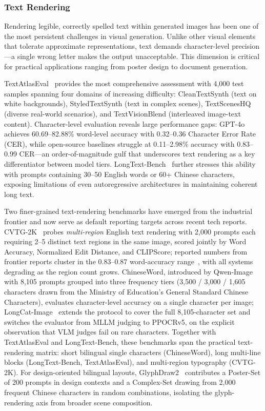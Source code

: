 \documentclass{llmxive}
\begin{document}
\subsubsection{Text Rendering}

Rendering legible, correctly spelled text within generated images has been one of the most persistent challenges in visual generation. Unlike other visual elements that tolerate approximate representations, text demands character-level precision---a single wrong letter makes the output unacceptable. This dimension is critical for practical applications ranging from poster design to document generation.

TextAtlasEval~\citep{TextAtlas5M} provides the most comprehensive assessment with 4,000 test samples spanning four domains of increasing difficulty: CleanTextSynth (text on white backgrounds), StyledTextSynth (text in complex scenes), TextScenesHQ (diverse real-world scenarios), and TextVisionBlend (interleaved image-text content). Character-level evaluation reveals large performance gaps: GPT-4o achieves 60.69--82.88\% word-level accuracy with 0.32--0.36 Character Error Rate (CER), while open-source baselines struggle at 0.11--2.98\% accuracy with 0.83--0.99 CER---an order-of-magnitude gulf that underscores text rendering as a key differentiator between model tiers. LongText-Bench~\citep{X-Omni} further stresses this ability with prompts containing 30--50 English words or 60+ Chinese characters, exposing limitations of even autoregressive architectures in maintaining coherent long text.

Two finer-grained text-rendering benchmarks have emerged from the industrial frontier and now serve as default reporting targets across recent tech reports. CVTG-2K~\citep{tai2025investigating} probes \emph{multi-region} English text rendering with 2{,}000 prompts each requiring 2--5 distinct text regions in the same image, scored jointly by Word Accuracy, Normalized Edit Distance, and CLIPScore; reported numbers from frontier reports cluster in the 0.83--0.87 word-accuracy range~\citep{wu2025qwen, cai2025z, team2025longcat, jdjoyaiimage}, with all systems degrading as the region count grows. ChineseWord, introduced by Qwen-Image~\citep{wu2025qwen} with 8{,}105 prompts grouped into three frequency tiers (3{,}500 / 3{,}000 / 1{,}605 characters drawn from the Ministry of Education's General Standard Chinese Characters), evaluates character-level accuracy on a single character per image; LongCat-Image~\citep{team2025longcat} extends the protocol to cover the full 8{,}105-character set and switches the evaluator from MLLM judging to PPOCRv5, on the explicit observation that VLM judges fail on rare characters. Together with TextAtlasEval and LongText-Bench, these benchmarks span the practical text-rendering matrix: short bilingual single characters (ChineseWord), long multi-line blocks (LongText-Bench, TextAtlasEval), and multi-region typography (CVTG-2K). For design-oriented bilingual layouts, GlyphDraw2~\citep{ma2025glyphdraw2} contributes a Poster-Set of 200 prompts in design contexts and a Complex-Set drawing from 2{,}000 frequent Chinese characters in random combinations, isolating the glyph-rendering axis from broader scene composition.
\end{document}
